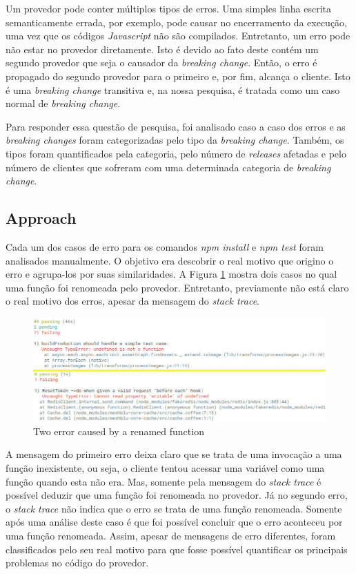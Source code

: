 Um provedor pode conter múltiplos tipos de erros. Uma simples linha escrita semanticamente errada, por exemplo, pode causar no encerramento da execução, uma vez que os códigos \textit{Javascript} não são compilados. Entretanto, um erro pode não estar no provedor diretamente. Isto é devido ao fato deste contém um segundo provedor que seja o causador da \textit{breaking change}. Então, o erro é propagado do segundo provedor para o primeiro e, por fim, alcança o cliente. Isto é uma \textit{breaking change} transitiva e, na nossa pesquisa, é tratada como um caso normal de \textit{breaking change}.

Para responder essa questão de pesquisa, foi analisado caso a caso dos erros e as \textit{breaking changes} foram categorizadas pelo tipo da \textit{breaking change}. Também, os tipos foram quantificados pela categoria, pelo número de \textit{releases} afetadas e pelo número de clientes que sofreram com uma determinada categoria de \textit{breaking change}.

\subsection{Approach}
\label{apr:rq2}

Cada um dos casos de erro para os comandos \textit{npm install} e \textit{npm test} foram analisados manualmente. O objetivo era descobrir o real motivo que origino o erro e agrupa-los por suas similaridades. A Figura \ref{fig:error_category} mostra dois casos no qual uma função foi renomeada pelo provedor. Entretanto, previamente não está claro o real motivo dos erros, apesar da mensagem do \textit{stack trace}.

\begin{figure}[!h]
    \centering
    \includegraphics[scale=0.5]{figuras/error_category.jpeg}
    \caption{Two error caused by a renamed function}
    \label{fig:error_category}
\end{figure}

A mensagem do primeiro erro deixa claro que se trata de uma invocação a uma função inexistente, ou seja, o cliente tentou acessar uma variável como uma função quando esta não era. Mas, somente pela mensagem do \textit{stack trace} é possível deduzir que uma função foi renomeada no provedor. Já no segundo erro, o \textit{stack trace} não indica que o erro se trata de uma função renomeada. Somente após uma análise deste caso é que foi possível concluir que o erro aconteceu por uma função renomeada. Assim, apesar de mensagens de erro diferentes, foram classificados pelo seu real motivo para que fosse possível quantificar os principais problemas no código do provedor.

